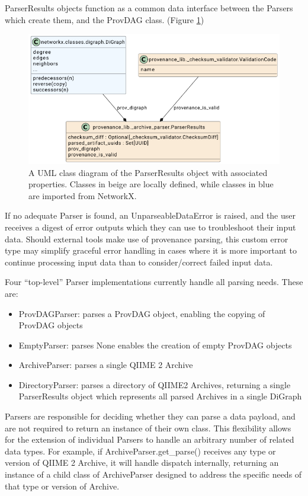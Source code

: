ParserResults objects function as a common data interface between the Parsers
which create them, and the ProvDAG class. (Figure \ref{fig:ParserResultsUML})

\begin{figure}[htp]
\centering
\includegraphics[width=\textwidth]{figures/ParserResultsUML.png}
\caption[UML Class diagram of the ParserResults class and its components]%
{A UML class diagram of the ParserResults object with associated properties.
Classes in beige are locally defined, while classes in blue are imported from
NetworkX.}
\label{fig:ParserResultsUML}
\end{figure}

If no adequate Parser is found, an UnparseableDataError is raised, and the user
receives a digest of error outputs which they can use to troubleshoot their
input data. Should external tools make use of provenance parsing, this custom
error type may simplify graceful error handling in cases where it is more
important to continue processing input data than to consider/correct failed
input data. 

Four “top-level” Parser implementations currently handle all parsing needs.
These are:
\begin{itemize}
    \item ProvDAGParser: parses a ProvDAG object, enabling the copying of ProvDAG objects
    \item EmptyParser: parses None enables the creation of empty ProvDAG objects
    \item ArchiveParser: parses a single QIIME 2 Archive
    \item DirectoryParser: parses a directory of QIIME2 Archives, returning a single ParserResults object which represents all parsed Archives in a single DiGraph
\end{itemize}

Parsers are responsible for deciding whether they can parse a data payload, and
are not required to return an instance of their own class. This flexibility
allows for the extension of individual Parsers to handle an arbitrary number of
related data types. For example, if ArchiveParser.get\_parse() receives any type
or version of QIIME 2 Archive, it will handle dispatch internally, returning an
instance of a child class of ArchiveParser designed to address the specific
needs of that type or version of Archive.

